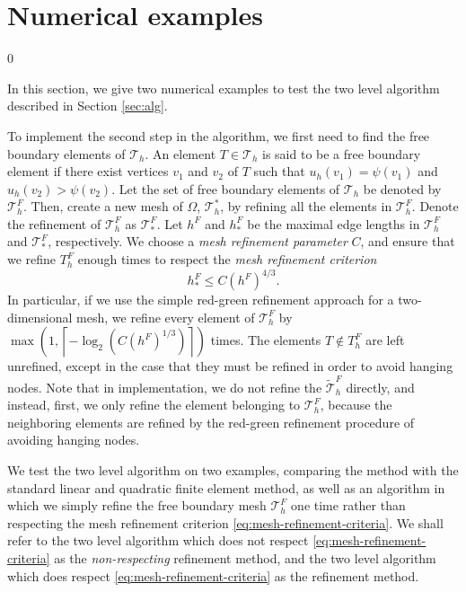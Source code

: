 \documentclass[12pt]{article}
\begin{document}
\section{Numerical examples}\label{sec:num}
\setcounter{equation}0

In this section, we give two numerical examples to test the two level algorithm described in Section \ref{sec:alg}.

To implement the second step in the algorithm, we first need
to find the free boundary elements of $\mathcal{T}_h$.  An element $T\in
  \mathcal{T}_h$ is said to be a free boundary element if there exist vertices
  $v_1$ and $v_2$ of $T$ such that $u_h(v_1)=\psi(v_1)$ and
  $u_h(v_2)>\psi(v_2)$. Let the set of free boundary elements of
  $\mathcal{T}_h$ be denoted by $\mathcal{T}_h^F$. 
Then, create a new mesh of $\Omega$, $\mathcal{T}_h^*$, by refining all the
  elements in $\mathcal{T}_h^F$.  Denote the refinement of $\mathcal{T}_h^F$ as $\mathcal{T}_*^F$.
Let $h^F$ and $h_*^F$ be the maximal edge lengths in $\mathcal{T}_h^F$ and $\mathcal{T}_*^F$, respectively.   
We choose a \textit{mesh refinement parameter} $C$, and  ensure that we refine $T_h^F$ enough times to respect
the \textit{mesh refinement criterion}
  \begin{equation}
    \label{eq:mesh-refinement-criteria}
    h_*^F\le C \left(h^F\right)^{4/3}.
  \end{equation}
In particular, if we use the simple red-green refinement approach for
a two-dimensional mesh, we refine every element of $\mathcal{T}_h^F$ by $\max\left(1,\left\lceil
-\log_2\left(C \left(h^F\right)^{1/3}\right)\right\rceil\right)$ times. 
The elements $T \notin T_h^F$ are left unrefined, except in the case that they must be refined 
in order to avoid hanging nodes.  
{\color{red} Note that in implementation, we do not refine the  $\tilde{\mathcal{T}}_h^F$ directly, and instead, first, we only refine the element belonging to $\mathcal{T}_h^F$, because the neighboring elements are refined by the red-green refinement procedure of avoiding hanging nodes.
}

We test the two level algorithm on two examples,
comparing the method with the standard linear and quadratic finite
element method, as well as an algorithm in which we simply
refine the free boundary mesh $\mathcal{T}_h^F$ one time rather than respecting
the mesh refinement criterion \eqref{eq:mesh-refinement-criteria}.  We
shall refer to the two level algorithm which does not respect
\eqref{eq:mesh-refinement-criteria} as the \textit{non-respecting}
refinement method, and the two level algorithm which does respect
\eqref{eq:mesh-refinement-criteria} as the refinement method. 
\end{document}

